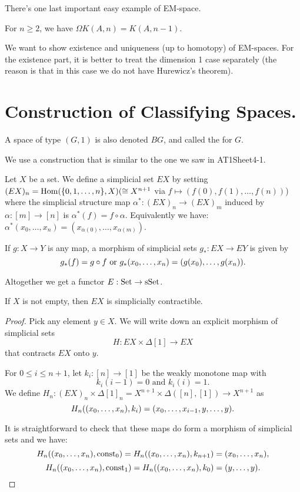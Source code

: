 

There's one last important easy example of EM-space.

\begin{example}
For $n\geq2$, we have $\Omega K(A,n)=K(A,n-1)$.
\end{example}

We want to show existence and uniqueness (up to homotopy) of EM-spaces. For the existence part, it is better to treat the dimension 1 case separately (the reason is that in this case we do not have Hurewicz's theorem).

\section{Construction of Classifying Spaces.}
\label{section:construction-of-classifying-spaces}

A space of type $(G,1)$ is also denoted $BG$, and called the  for $G$.

We use a construction that is similar to the one we saw in AT1Sheet4-1.

\begin{construction}
Let $X$ be a set. We define a simplicial set $EX$ by setting $(EX)_n=\operatorname{Hom}(\{0,1,\dots,n\},X)(\cong X^{n+1}$ via $f\mapsto(f(0),f(1),\dots,f(n))$) where the simplicial structure map $\alpha^*:(EX)_n\to(EX)_m$ induced by $\alpha:[m]\to[n]$ is $\alpha^*(f)=f\circ\alpha$. Equivalently we have: $\alpha^*(x_0,\dots,x_n)=(x_{\alpha(0)},\dots,x_{\alpha(m)})$.

If $g:X\to Y$ is any map, a morphism of simplicial sets $g_*:EX\to EY$ is given by
\[g_*(f)=g\circ f\text{ or }g_*({x_0,\dots,x_n})=(g(x_0),\dots,g(x_n)).\]

Altogether we get a functor $E:{\mathrm{Set}}\to{\mathrm{sSet}}$.
\end{construction}

\begin{proposition}
If $X$ is not empty, then $EX$ is simplicially contractible.
\end{proposition}

\begin{proof}
Pick any element $y\in X$. We will write down an explicit morphism of simplicial sets
\[H:EX\times\Delta[1]\to EX\]
that contracts $EX$ onto $y$.

For $0 \le i \le n+1$, let $k_i:[n]\to[1]$ be the weakly monotone map with
\[k_i(i-1)=0\text{ and }k_i(i)=1.\]
We define $H_n:(EX)_n\times\Delta[1]_n=X^{n+1}\times\Delta([n],[1])\to X^{n+1}$ as
\[H_n(({x_0,\dots,x_n}),k_i)=(x_0,\dots,x_{i-1},y,\dots,y).\]

It is straightforward to check that these maps do form a morphism of simplicial sets and we have:
\[H_n(({x_0,\dots,x_n}),\operatorname{const}_0)=H_n(({x_0,\dots,x_n}),k_{n+1})=({x_0,\dots,x_n}),\]
\[H_n(({x_0,\dots,x_n}),\operatorname{const}_1)=H_n(({x_0,\dots,x_n}),k_0)=(y,\dots,y).\]
\end{proof}


